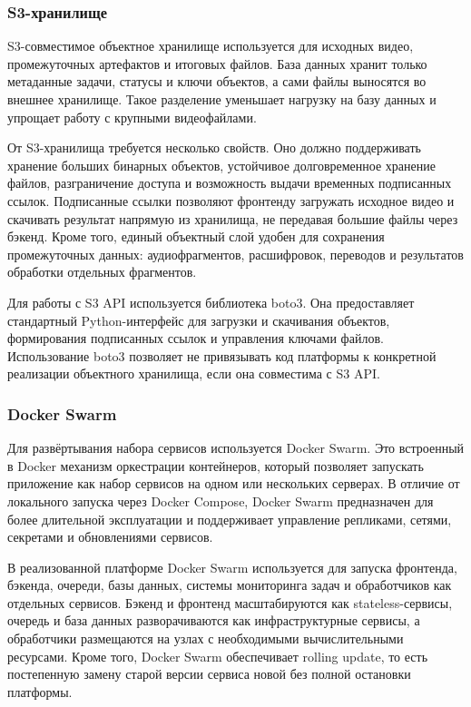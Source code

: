 \documentclass[a4paper,article,14pt]{extarticle}
\begin{document}
\subsubsection{S3-хранилище}

S3-совместимое объектное хранилище используется для исходных видео, промежуточных артефактов и итоговых файлов. База данных хранит только метаданные задачи, статусы и ключи объектов, а сами файлы выносятся во внешнее хранилище. Такое разделение уменьшает нагрузку на базу данных и упрощает работу с крупными видеофайлами.

От S3-хранилища требуется несколько свойств. Оно должно поддерживать хранение больших бинарных объектов, устойчивое долговременное хранение файлов, разграничение доступа и возможность выдачи временных подписанных ссылок. Подписанные ссылки позволяют фронтенду загружать исходное видео и скачивать результат напрямую из хранилища, не передавая большие файлы через бэкенд. Кроме того, единый объектный слой удобен для сохранения промежуточных данных: аудиофрагментов, расшифровок, переводов и результатов обработки отдельных фрагментов.

Для работы с S3 API используется библиотека boto3. Она предоставляет стандартный Python-интерфейс для загрузки и скачивания объектов, формирования подписанных ссылок и управления ключами файлов. Использование boto3 позволяет не привязывать код платформы к конкретной реализации объектного хранилища, если она совместима с S3 API.

\subsubsection{Docker Swarm}

Для развёртывания набора сервисов используется Docker Swarm. Это встроенный в Docker механизм оркестрации контейнеров, который позволяет запускать приложение как набор сервисов на одном или нескольких серверах. В отличие от локального запуска через Docker Compose, Docker Swarm предназначен для более длительной эксплуатации и поддерживает управление репликами, сетями, секретами и обновлениями сервисов.

В реализованной платформе Docker Swarm используется для запуска фронтенда, бэкенда, очереди, базы данных, системы мониторинга задач и обработчиков как отдельных сервисов. Бэкенд и фронтенд масштабируются как stateless-сервисы, очередь и база данных разворачиваются как инфраструктурные сервисы, а обработчики размещаются на узлах с необходимыми вычислительными ресурсами. Кроме того, Docker Swarm обеспечивает rolling update, то есть постепенную замену старой версии сервиса новой без полной остановки платформы.
\end{document}
